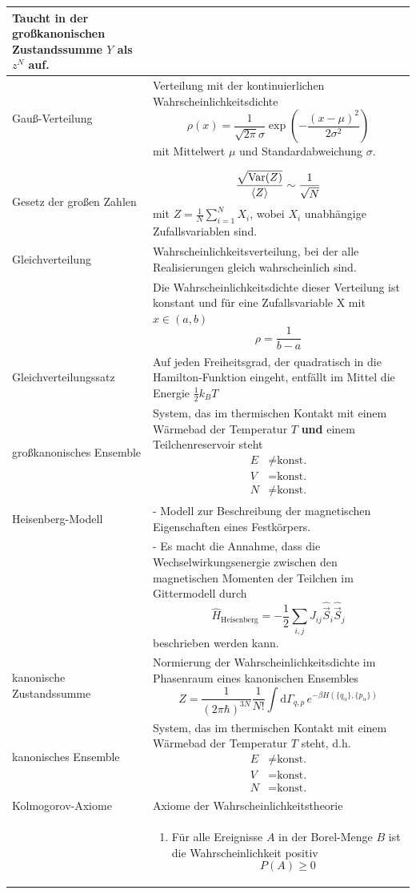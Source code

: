 \documentclass{article}
\newcommand{\diff}{\mathrm{d}}
\newcommand{\lr}[1]{\left(#1\right)}
\begin{document}
\begin{xltabular}{\linewidth}{p{6cm}|X}
		Taucht in der großkanonischen Zustandssumme $Y$ als $z^N$ auf. \\
	\hline
		Gauß-Verteilung & Verteilung mit der kontinuierlichen Wahrscheinlichkeitsdichte
			$$\rho(x) = \frac{1}{\sqrt{2\pi}\sigma} \exp\lr{-\frac{(x-\mu)^2}{2\sigma^2}}$$ 
		mit Mittelwert $\mu$ und Standardabweichung $\sigma$. \\
	\hline
		Gesetz der großen Zahlen & $$\frac{\sqrt{\text{Var}(Z)}}{\braket{Z}} \sim \frac{1}{\sqrt{N}}$$ 
		mit $Z = \frac{1}{N}\sum_{i=1}^N X_i$, wobei $X_i$ unabhängige Zufallsvariablen sind. \\
	\hline
		Gleichverteilung & Wahrscheinlichkeitsverteilung, bei der alle Realisierungen gleich wahrscheinlich sind. \\
		& Die Wahrscheinlichkeitsdichte dieser Verteilung ist konstant und für eine Zufallsvariable X mit $x\in(a,b)$
			$$\rho = \frac{1}{b-a}$$ \\
	\hline
		Gleichverteilungssatz & Auf jeden Freiheitsgrad, der quadratisch in die Hamilton-Funktion eingeht, entfällt im Mittel die Energie $\frac{1}{2}k_B T$ \\
	\hline
		großkanonisches Ensemble & System, das im thermischen Kontakt mit einem Wärmebad der Temperatur $T$ \textbf{und} einem Teilchenreservoir steht
		{\begin{align*}
			E &\neq \text{konst.} \\
			V &= \text{konst.} \\
			N &\neq \text{konst.}
		\end{align*}} \\
	\hline
		Heisenberg-Modell & - Modell zur Beschreibung der magnetischen Eigenschaften eines Festkörpers. \\
		& - Es macht die Annahme, dass die Wechselwirkungsenergie zwischen den magnetischen Momenten der Teilchen im Gittermodell durch
			$$\hat{H}_{\text{Heisenberg}} = -\frac{1}{2} \sum_{i,j} J_{ij} \hat{\vec{S}}_i \hat{\vec{S}}_j$$ 
		beschrieben werden kann. \\
	\hline
		kanonische Zustandssumme & Normierung der Wahrscheinlichkeitsdichte im Phasenraum eines kanonischen Ensembles
			$$Z = \frac{1}{(2\pi\hbar)^{3N}} \frac{1}{N!} \int \diff\Gamma_{q,p}\, e^{-\beta H(\{q_\alpha\},\{p_\alpha\})}$$ \\
	\hline
		kanonisches Ensemble & System, das im thermischen Kontakt mit einem Wärmebad der Temperatur $T$ steht, d.h.
		{\begin{align*}
			E &\neq \text{konst.} \\
			V &= \text{konst.} \\
			N &= \text{konst.}
		\end{align*}} \\
	\hline
		Kolmogorov-Axiome & Axiome der Wahrscheinlichkeitstheorie \\
		& {\begin{enumerate}
			\item Für alle Ereignisse $A$ in der Borel-Menge $B$ ist die Wahrscheinlichkeit positiv
				$$P(A) \geq 0$$


\end{enumerate}}
\end{xltabular}
\end{document}

